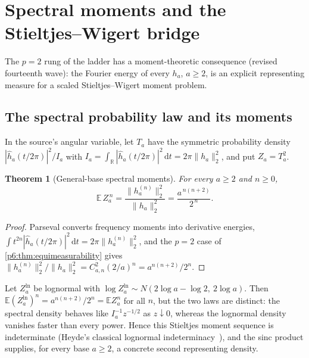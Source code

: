 \documentclass[11pt,oneside]{article}
\numberwithin{equation}{section}
\newtheorem{theorem}{Theorem}[section]
\theoremstyle{definition}
\theoremstyle{remark}
\newcommand{\R}{\mathbb R}
\newcommand{\E}{\mathbb E}
\newcommand{\dd}{\,\mathrm d}
\begin{document}
\section{Spectral moments and the Stieltjes--Wigert bridge}
\label{p6:sec:spectral-sw}

The $p=2$ rung of the ladder has a moment-theoretic consequence (revised
fourteenth wave): the Fourier energy of every $h_a$, $a\ge2$, is an explicit
representing measure for a scaled Stieltjes--Wigert moment problem.

\subsection{The spectral probability law and its moments}

In the source's angular variable, let $T_a$ have the symmetric probability
density $|\widehat h_a(t/2\pi)|^2/I_a$ with
$I_a=\int_\R|\widehat h_a(t/2\pi)|^2\dd t=2\pi\|h_a\|_2^2$, and put
$Z_a=T_a^2$.

\begin{theorem}[General-base spectral moments]\label{p6:thm:spectral-moments}
For every $a\ge2$ and $n\ge0$,
\begin{equation}\label{p6:eq:spectral-moments}
 \boxed{\ \E\,Z_a^{\,n}
 =\frac{\|h_a^{(n)}\|_2^2}{\|h_a\|_2^2}
 =\frac{a^{\,n(n+2)}}{2^{\,n}}.\ }
\end{equation}
\end{theorem}

\begin{proof}
Parseval converts frequency moments into derivative energies,
$\int t^{2n}|\widehat h_a(t/2\pi)|^2\dd t=2\pi\|h_a^{(n)}\|_2^2$, and the
$p=2$ case of \cref{p6:thm:equimeasurability} gives
$\|h_a^{(n)}\|_2^2/\|h_a\|_2^2
=C_{a,n}^2(2/a)^n=a^{n(n+2)}/2^n$.
\end{proof}

\begin{corollary}
\label{p6:cor:lognormal-twins}
Let $Z_a^{\mathrm{ln}}$ be lognormal with
$\log Z_a^{\mathrm{ln}}\sim N(2\log a-\log2,\ 2\log a)$.  Then
$\E(Z_a^{\mathrm{ln}})^n=a^{n(n+2)}/2^n=\E Z_a^n$ for all $n$, but the two
laws are distinct: the spectral density behaves like $I_a^{-1}z^{-1/2}$ as
$z\downarrow0$, whereas the lognormal density vanishes faster than every
power.  Hence this Stieltjes moment sequence is indeterminate
(Heyde's classical lognormal indeterminacy~\cite{p6:heyde}), and the sinc
product supplies, for every base $a\ge2$, a concrete second representing
density.
\end{corollary}
\end{document}
